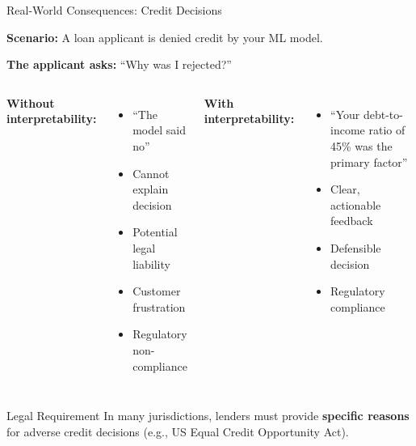 \documentclass[10pt]{beamer}
\newcommand{\highlight}[1]{\textcolor{AccentOrange}{\textbf{#1}}}
\begin{document}

\begin{frame}{Real-World Consequences: Credit Decisions}

  \textbf{Scenario:} A loan applicant is denied credit by your ML model.

  \vspace{1em}
  \textbf{The applicant asks:} ``Why was I rejected?''

  \vspace{0.5em}
  \begin{columns}[T]
    \textcolor{AccentRed}{\textbf{Without interpretability:}}
    \begin{itemize}
      \item ``The model said no''
      \item Cannot explain decision
      \item Potential legal liability
      \item Customer frustration
      \item Regulatory non-compliance
    \end{itemize}

    \textcolor{AccentGreen}{\textbf{With interpretability:}}
    \begin{itemize}
      \item ``Your debt-to-income ratio of 45\% was the primary factor''
      \item Clear, actionable feedback
      \item Defensible decision
      \item Regulatory compliance
    \end{itemize}
  \end{columns}

  \vspace{1em}
  \begin{block}{Legal Requirement}
    In many jurisdictions, lenders must provide \highlight{specific reasons} for adverse credit decisions (e.g., US Equal Credit Opportunity Act).
  \end{block}
\end{frame}

\end{document}
